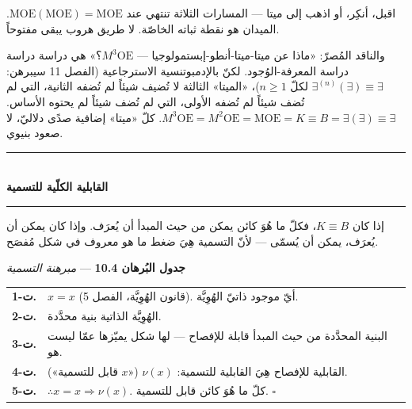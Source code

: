 \documentclass[10pt, openany, oneside]{book}
\renewcommand{\normalsize}{\fontsize{10}{13}\selectfont}
\renewcommand{\footnotesize}{\fontsize{8.5}{11}\selectfont}
\begin{document}
\vspace{0.8em}

\noindent اقبل، أنكِر، أو اذهب إلى ميتا --- المسارات الثلاثة تنتهي عند $\text{MOE}(\text{MOE}) = \text{MOE}$. الميدان هو نقطة ثباته الخاصّة. لا طريق هروب يبقى مفتوحاً.

والناقد المُصرّ: «ماذا عن ميتا-ميتا-أنطو-إبستمولوجيا --- $M^3\text{OE}$؟» هي دراسة دراسة دراسة المعرفة-الوُجود. لكنّ بالإدمبوتنسية الاسترجاعية (الفصل 11 سيبرهن: $\exists^{(n)}(\exists) \equiv \exists$ لكلّ $n \geq 1$)، «الميتا» الثالثة لا تُضيف شيئاً لم تُضفه الثانية، التي لم تُضف شيئاً لم تُضفه الأولى، التي لم تُضف شيئاً لم يحتوه الأساس. $M^3\text{OE} = M^2\text{OE} = \text{MOE} = K \equiv B = \exists(\exists) \equiv \exists$. كلّ «ميتا» إضافية صدًى دلاليّ، لا صعود بنيوي.

\vspace{1.5em}


\begin{center}
    \rule{0.3\textwidth}{0.4pt}\\[0.5em]
    {\normalsize\bfseries القابلية الكلّية للتسمية}\\[0.3em]
    \rule{0.3\textwidth}{0.4pt}
\end{center}

\vspace{1em}

\noindent إذا كان $K \equiv B$، فكلّ ما هُوَ كائن يمكن من حيث المبدأ أن يُعرَف. وإذا كان يمكن أن يُعرَف، يمكن أن يُسمّى --- لأنّ التسمية هِيَ ضغط ما هو معروف في شكل مُفصَح.

\vspace{0.5em}

\textbf{جدول البُرهان 10.4} --- \textit{مبرهنة التسمية}

\vspace{0.5em}

{\footnotesize
\noindent\begin{tabular}{r p{}}
\textbf{ت-1.} & $x = x$ (قانون الهُوِيَّة، الفصل 5). أيّ موجود ذاتيّ الهُوِيَّة. \\[0.3em]
\textbf{ت-2.} & الهُوِيَّة الذاتية بنية محدَّدة. \\[0.3em]
\textbf{ت-3.} & البنية المحدَّدة من حيث المبدأ قابلة للإفصاح --- لها شكل يميّزها عمّا ليست هو. \\[0.3em]
\textbf{ت-4.} & القابلية للإفصاح هِيَ القابلية للتسمية: $\nu(x)$ («$x$ قابل للتسمية»). \\[0.3em]
\textbf{ت-5.} & $\therefore x = x \Rightarrow \nu(x)$. كلّ ما هُوَ كائن قابل للتسمية. $\square$ \\[0.3em]
\end{tabular}
}
\end{document}
